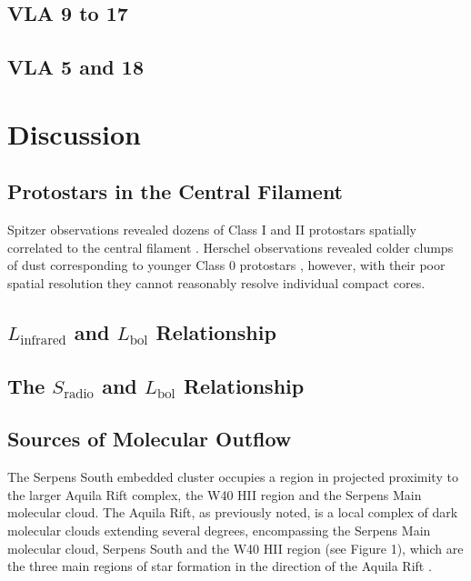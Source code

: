 \documentclass[apj]{emulateapj}
\begin{document}
\subsection{VLA 9 to 17}
\label{subsec:vla9_to_17}




\subsection{VLA 5 and 18}
\label{subsec:vla18}






\section{Discussion}

\subsection{Protostars in the Central Filament}
Spitzer observations revealed dozens of Class I and II protostars spatially correlated to the central filament \citep{Gutermuth08}. Herschel observations revealed colder clumps of dust corresponding to younger Class 0 protostars \citep{Bontemps10}, however, with their poor spatial resolution they cannot reasonably resolve individual compact cores. 


\subsection{$L_{\text{infrared}}$ and $L_{\text{bol}}$ Relationship}





\subsection{The $S_{\text{radio}}$ and $L_{\text{bol}}$ Relationship}




\subsection{Sources of Molecular Outflow}




The Serpens South embedded cluster occupies a region in projected proximity to the larger Aquila Rift complex, the W40 HII region and the Serpens Main molecular cloud. The Aquila Rift, as previously noted, is a local complex of dark molecular clouds extending several degrees, encompassing the Serpens Main molecular cloud, Serpens South and the W40 HII region (see Figure 1), which are the three main regions of star formation in the direction of the Aquila Rift \citep{Eiroa08}. 
\end{document}
